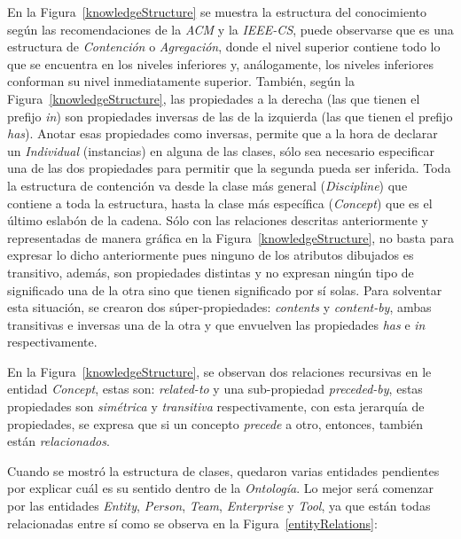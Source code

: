 \begin{itemize}
En la Figura~\ref{knowledgeStructure} se muestra la estructura del conocimiento según las recomendaciones de la \textit{ACM} y la \textit{IEEE-CS}, puede observarse que es una estructura de \textit{Contención} o \textit{Agregación}, donde el nivel superior contiene todo lo que se encuentra en los niveles inferiores y, análogamente, los niveles inferiores conforman su nivel inmediatamente superior. También, según la Figura~\ref{knowledgeStructure}, las propiedades a la derecha (las que tienen el prefijo \textit{in}) son propiedades inversas de las de la izquierda (las que tienen el prefijo \textit{has}). Anotar esas propiedades como inversas, permite que a la hora de declarar un \textit{Individual} (instancias) en alguna de las clases, sólo sea necesario especificar una de las dos propiedades para permitir que la segunda pueda ser inferida. Toda la estructura de contención va desde la clase más general (\textit{Discipline}) que contiene a toda la estructura, hasta la clase más específica (\textit{Concept}) que es el último eslabón de la cadena. Sólo con las relaciones descritas anteriormente y representadas de manera gráfica en la Figura~\ref{knowledgeStructure}, no basta para expresar lo dicho anteriormente pues ninguno de los atributos dibujados es transitivo, además, son propiedades distintas y no expresan ningún tipo de significado una de la otra sino que tienen significado por sí solas. Para solventar esta situación, se crearon dos súper-propiedades: \textit{contents} y \textit{content-by}, ambas transitivas e inversas una de la otra y que envuelven las propiedades \textit{has} e \textit{in} respectivamente.

En la Figura~\ref{knowledgeStructure}, se observan dos relaciones recursivas en le entidad \textit{Concept}, estas son: \textit{related-to} y una sub-propiedad \textit{preceded-by}, estas propiedades son \textit{simétrica} y \textit{transitiva} respectivamente, con esta jerarquía de propiedades, se expresa que si un concepto \textit{precede} a otro, entonces, también están \textit{relacionados}.

Cuando se mostró la estructura de clases, quedaron varias entidades pendientes por explicar cuál es su sentido dentro de la \textit{Ontología}. Lo mejor será comenzar por las entidades \textit{Entity}, \textit{Person}, \textit{Team}, \textit{Enterprise} y \textit{Tool}, ya que están todas relacionadas entre sí como se observa en la Figura~\ref{entityRelations}:


\end{itemize}
